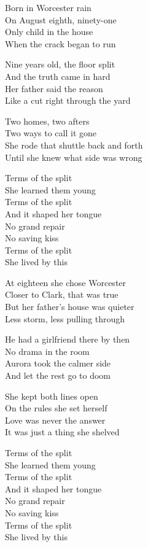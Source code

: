 \begin{lyrics}
Born in Worcester rain\\
On August eighth, ninety-one\\
Only child in the house\\
When the crack began to run

Nine years old, the floor split\\
And the truth came in hard\\
Her father said the reason\\
Like a cut right through the yard

Two homes, two afters\\
Two ways to call it gone\\
She rode that shuttle back and forth\\
Until she knew what side was wrong

Terms of the split\\
She learned them young\\
Terms of the split\\
And it shaped her tongue\\
No grand repair\\
No saving kiss\\
Terms of the split\\
She lived by this

At eighteen she chose Worcester\\
Closer to Clark, that was true\\
But her father’s house was quieter\\
Less storm, less pulling through

He had a girlfriend there by then\\
No drama in the room\\
Aurora took the calmer side\\
And let the rest go to doom

She kept both lines open\\
On the rules she set herself\\
Love was never the answer\\
It was just a thing she shelved

Terms of the split\\
She learned them young\\
Terms of the split\\
And it shaped her tongue\\
No grand repair\\
No saving kiss\\
Terms of the split\\
She lived by this


\end{lyrics}

